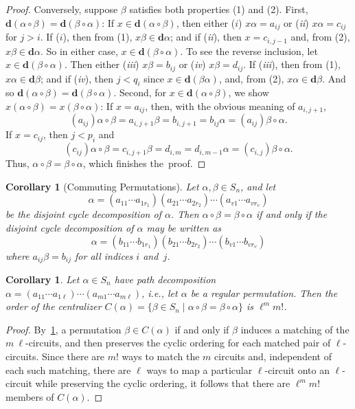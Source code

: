 \documentclass{surv-l}
\numberwithin{equation}{section}
\numberwithin{table}{section}
\numberwithin{figure}{section}
\theoremstyle{plain}
\newtheorem{corollary}[equation]{Corollary}
\theoremstyle{definition}
\begin{document}
\begin{proof}
Conversely, suppose $\beta$ satisfies both properties (1) and (2).
First, $\mathbf{d}(\alpha \circ \beta)=\mathbf{d}(\beta
\circ\alpha)$: If $x\in \mathbf{d}(\alpha \circ\beta)$, then
either ($i$) $x\alpha=a_{ij}$ or (\emph{ii}) $x\alpha=c_{ij}$ for
$j>i$. If ($i$), then from (1), $x\beta\in \mathbf{d}\alpha$;
and if (\emph{ii}), then $x=c_{i,j-1}$ and, from (2), $x\beta\in
\mathbf{d}\alpha$. So in either case, $x\in \mathbf{d}(\beta
\circ\alpha)$. To see the reverse inclusion, let $x\in
\mathbf{d}(\beta \circ\alpha)$. Then either (\emph{iii})
$x\beta=b_{ij}$ or (\emph{iv}) $x\beta=d_{ij}$. If (\emph{iii}),
then from (1), $ x\alpha\in \mathbf{d}\beta$; and if (\emph{iv}),
then $j<q_{i}$ since $x\in \mathbf{d}(\beta\alpha)$, and, from
(2), $ x\alpha\in \mathbf{d}\beta$. And so $\mathbf{d}(\alpha
\circ\beta)=\mathbf{d}(\beta \circ\alpha)$. Second, for $x\in
\mathbf{d}(\alpha \circ\beta)$, we show $x(\alpha
\circ\beta)=x(\beta \circ\alpha)$: If $x=a_{ij}$, then, with the
obvious meaning of $a_{i,j+1}$,
\[
(a_{ij})\alpha\circ\beta=a_{i,j+1}\beta=b_{i,j+1}=b_{ij}\alpha=(a_{ij})\beta\circ\alpha.
\]
If $x=c_{ij}$, then $j<p_{i}$ and
\[
(c_{ij})\alpha \circ\beta=c_{i,j+1}\beta=d_{i,m}=d_{i,m-1}\alpha=(c_{i,j})\beta\circ\alpha.
\]
Thus, $\alpha \circ\beta=\beta \circ\alpha$, which finishes
the~proof.
\end{proof}

\setcounter{equation}{7}
\begin{corollary}[Commuting Permutations]\label{cor3.10.8}
Let $\alpha,\beta\in S_{n}$, and let
\[
\alpha=(a_{11}\cdots a_{1r_{1}})(a_{21}\cdots a_{2r_{2}})\cdots(a_{v1}\cdots a_{vr_{v}})
\]
be the disjoint cycle decomposition of $\alpha$. Then $\alpha
\circ\beta=\beta \circ\alpha$ if and only if the disjoint cycle
decomposition of $\alpha$ may be written as
\[
\alpha=(b_{11}\cdots b_{1r_{1}})(b_{21}\cdots b_{2r_{2}})\cdots(b_{v1}\cdots b_{vr_{v}})
\]
where $a_{ij}\beta=b_{ij}$ for all indices $i$ and~$j$.
\end{corollary}

\begin{corollary}\label{cor3.10.9}
Let $\alpha\in S_{n}$ have path decomposition
$\alpha=(a_{11}\cdots a_{1\ell})\cdots (a_{m1}\cdots
a_{m\ell})$, i.e., let $\alpha$ be a regular permutation. Then the
order of the centralizer $C(\alpha)= \{\beta\in
S_{n}\mid \alpha \circ\beta=\beta \circ\alpha\}$ is $\ell^{m}m!$.
\end{corollary}

\begin{proof} By~\ref{cor3.10.8}, a permutation $\beta\in C(\alpha)$ if and only if
$\beta$ induces a matching of the $m\ \ell$-circuits, and then
preserves the cyclic ordering for each matched pair of
$\ell$-circuits. Since there are $m!$ ways to match the $m$
circuits and, independent of each such matching, there are $\ell$
ways to map a particular $\ell$-circuit onto an $\ell$-circuit
while preserving the cyclic ordering, it follows that there are
$\ell^{m}m!$ members of $C(\alpha).$
\end{proof}
\end{document}
